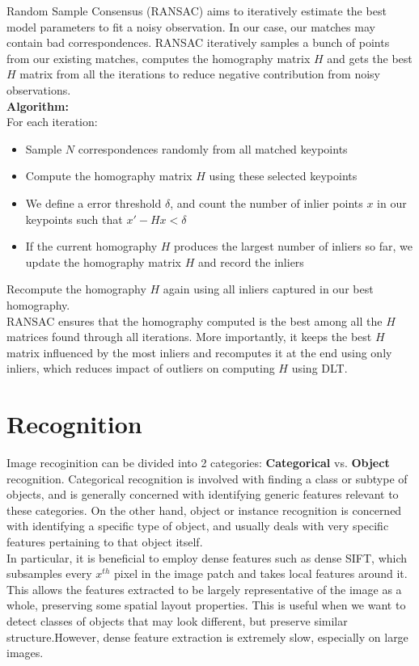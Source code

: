 \documentclass[12pt]{article}
\begin{document}
Random Sample Consensus (RANSAC) aims to iteratively estimate the best model parameters to fit a noisy observation. In our case, our matches may contain bad correspondences. RANSAC iteratively samples a bunch of points from our existing matches, computes the homography matrix $H$ and gets the best $H$ matrix from all the iterations to reduce negative contribution from noisy observations.\\

\textbf{Algorithm:}\\
For each iteration:\\
\begin{itemize}
\item Sample $N$ correspondences randomly from all matched keypoints
\item Compute the homography matrix $H$ using these selected keypoints
\item We define a error threshold $\delta$, and count the number of inlier points $x$ in our keypoints such that $x' - Hx < \delta$
\item If the current homography $H$ produces the largest number of inliers so far, we update the homography matrix $H$ and record the inliers
\end{itemize}
Recompute the homography $H$ again using all inliers captured in our best homography. \\

RANSAC ensures that the homography computed is the best among all the $H$ matrices found through all iterations. More importantly, it keeps the best $H$ matrix influenced by the most inliers and recomputes it at the end using only inliers, which reduces impact of outliers on computing $H$ using DLT.

\section{Recognition}

Image recoginition can be divided into 2 categories: \textbf{Categorical} vs. \textbf{Object} recognition. Categorical recognition is involved with finding a class or subtype of objects, and is generally concerned with identifying generic features relevant to these categories. On the other hand, object or instance recognition is concerned with identifying a specific type of object, and usually deals with very specific features pertaining to that object itself.\\

In particular, it is beneficial to employ dense features such as dense SIFT, which subsamples every $x^{th}$ pixel in the image patch and takes local features around it. This allows the features extracted to be largely representative of the image as a whole, preserving some spatial layout properties.  This is useful when we want to detect classes of objects that may look different, but preserve similar structure.However, dense feature extraction is extremely slow, especially on large images.\\
\end{document}
